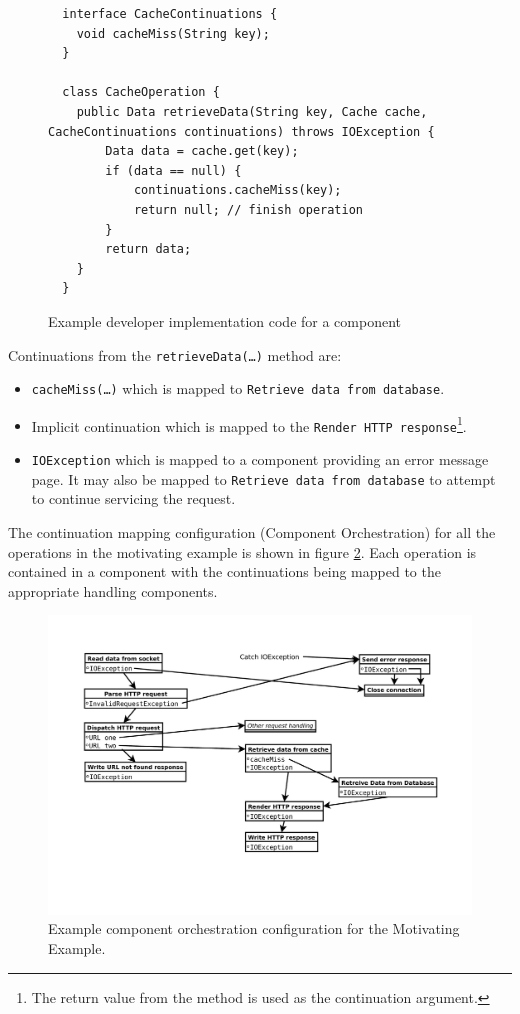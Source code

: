 \documentclass[prodmode]{style/acmlarge}
\begin{document}
\begin{figure}[tp]
\centering
\begin{verbatim}
  interface CacheContinuations {
    void cacheMiss(String key);
  }

  class CacheOperation {    
    public Data retrieveData(String key, Cache cache, CacheContinuations continuations) throws IOException {
        Data data = cache.get(key);
        if (data == null) {
            continuations.cacheMiss(key);
            return null; // finish operation
        }
        return data;
    }
  }
\end{verbatim}
\caption{Example developer implementation code for a component\footnotemark}
\label{fig:Example_Method_Operation}
\end{figure}

Continuations from the \texttt{retrieveData(\ldots)} method are:
\begin{itemize}
  \item \texttt{cacheMiss(\ldots)} which is mapped to \texttt{Retrieve data from database}.
  \item Implicit continuation which is mapped to the \texttt{Render HTTP response}\footnote{The return value from the method is used as the continuation argument.}.
  \item \texttt{IOException} which is mapped to a component providing an error message page.  It may also be mapped to \texttt{Retrieve data from database} to attempt to continue servicing the request.
\end{itemize}

The continuation mapping configuration (Component Orchestration) for all the
operations in the motivating example is shown in figure
\ref{fig:ExampleComponentOrchestration}.  Each operation is contained in a
component with the continuations being mapped to the appropriate handling
components.
 
\begin{figure}[!t]
\centering
\includegraphics[width=4.5in]{ContinuationInjectionComponentOrchestration}
\caption{Example component orchestration configuration for the Motivating Example.}
\label{fig:ExampleComponentOrchestration}
\end{figure}
\end{document}

